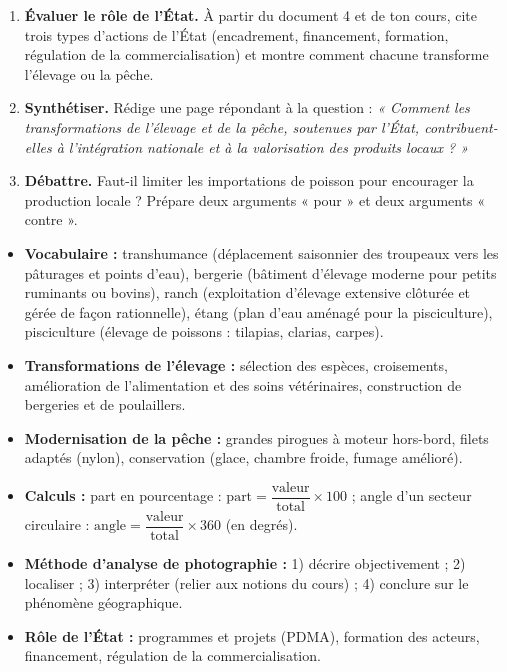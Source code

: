 \documentclass[11pt]{article}
\newcommand{\cle}[1]{{\popxbold\color{popdark}#1}}
\newcounter{popsec}
\newcounter{popsub}
\newcommand{\courssub}[1]{%
  \stepcounter{popsub}%
  \par\vspace{9pt}\noindent{\popxbold\fontsize{11.5}{13}\selectfont\color{popink}{\color{poporange}\thepopsec.\thepopsub}\hspace{6pt}#1}\par\nopagebreak\vspace{4pt}
}
\begin{document}
\begin{enumerate}
\item \textbf{Évaluer le rôle de l'État.} À partir du document 4 et de ton cours, cite trois types d'actions de l'État (encadrement, financement, formation, régulation de la commercialisation) et montre comment chacune transforme l'élevage ou la pêche.
\item \textbf{Synthétiser.} Rédige une page répondant à la question : \emph{« Comment les transformations de l'élevage et de la pêche, soutenues par l'État, contribuent-elles à l'intégration nationale et à la valorisation des produits locaux ? »}
\item \textbf{Débattre.} Faut-il limiter les importations de poisson pour encourager la production locale ? Prépare deux arguments « pour » et deux arguments « contre ».
\end{enumerate}

\courssub{Ressources à mobiliser}

\begin{aretenir}
\begin{itemize}
\item \textbf{Vocabulaire :} \cle{transhumance} (déplacement saisonnier des troupeaux vers les pâturages et points d'eau), \cle{bergerie} (bâtiment d'élevage moderne pour petits ruminants ou bovins), \cle{ranch} (exploitation d'élevage extensive clôturée et gérée de façon rationnelle), \cle{étang} (plan d'eau aménagé pour la pisciculture), \cle{pisciculture} (élevage de poissons : tilapias, clarias, carpes).
\item \textbf{Transformations de l'élevage :} sélection des espèces, croisements, amélioration de l'alimentation et des soins vétérinaires, construction de bergeries et de poulaillers.
\item \textbf{Modernisation de la pêche :} grandes pirogues à moteur hors-bord, filets adaptés (nylon), conservation (glace, chambre froide, fumage amélioré).
\item \textbf{Calculs :} part en pourcentage : $\text{part} = \dfrac{\text{valeur}}{\text{total}} \times 100$ ; angle d'un secteur circulaire : $\text{angle} = \dfrac{\text{valeur}}{\text{total}} \times 360$ (en degrés).
\item \textbf{Méthode d'analyse de photographie :} 1) décrire objectivement ; 2) localiser ; 3) interpréter (relier aux notions du cours) ; 4) conclure sur le phénomène géographique.
\item \textbf{Rôle de l'État :} programmes et projets (PDMA), formation des acteurs, financement, régulation de la commercialisation.
\end{itemize}
\end{aretenir}
\end{document}
